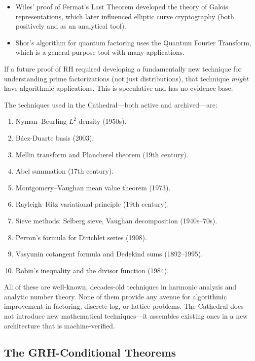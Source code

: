 \documentclass[11pt,a4paper]{article}
\begin{document}
\begin{itemize}
  \item Wiles' proof of Fermat's Last Theorem developed the theory of
    Galois representations, which later influenced elliptic curve
    cryptography (both positively and as an analytical tool).
  \item Shor's algorithm for quantum factoring uses the Quantum Fourier
    Transform, which is a general-purpose tool with many applications.
\end{itemize}

If a future proof of RH required developing a fundamentally new
technique for understanding prime factorizations (not just
distributions), that technique \emph{might} have algorithmic
applications. This is speculative and has no evidence base.

\begin{claim}
The techniques used in the Cathedral---both active and archived---are:
\begin{enumerate}
  \item Nyman--Beurling $L^2$ density (1950s).
  \item B\'aez-Duarte basis (2003).
  \item Mellin transform and Plancherel theorem (19th century).
  \item Abel summation (17th century).
  \item Montgomery--Vaughan mean value theorem (1973).
  \item Rayleigh--Ritz variational principle (19th century).
  \item Sieve methods: Selberg sieve, Vaughan decomposition (1940s--70s).
  \item Perron's formula for Dirichlet series (1908).
  \item Vasyunin cotangent formula and Dedekind sums (1892--1995).
  \item Robin's inequality and the divisor function (1984).
\end{enumerate}
All of these are well-known, decades-old techniques in harmonic
analysis and analytic number theory. None of them provide any
avenue for algorithmic improvement in factoring, discrete log,
or lattice problems. The Cathedral does not introduce new
mathematical techniques---it assembles existing ones in a new
architecture that is machine-verified.
\end{claim}

\subsection{The GRH-Conditional Theorems}
\end{document}
